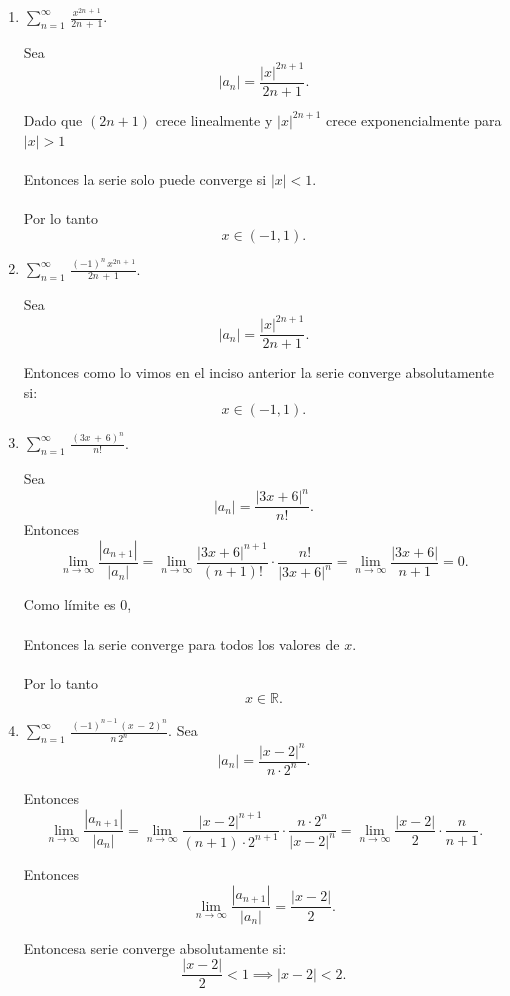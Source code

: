 \documentclass{article}
\begin{document}
\begin{enumerate}
\begin{enumerate}
\item $\displaystyle\sum_{n=1}^{\infty}\,\frac{x^{2n\,+\,1}}{2n\,+\,1}$.

Sea
   \[
   \left|a_n\right| = \frac{|x|^{2n+1}}{2n+1}.
   \]

Dado que \( (2n+1) \) crece linealmente y \(|x|^{2n+1}\) crece exponencialmente para \(|x| > 1\)\\
\\
Entonces la serie solo puede converge si \(|x| < 1\).\\
\\
Por lo tanto
   \[
   x \in (-1, 1).
   \]

\item $\displaystyle\sum_{n=1}^{\infty}\,\frac{(-1)^n\,x^{2n\,+\,1}}{2n\,+\,1}$.

Sea
   \[
   \left|a_n\right| = \frac{|x|^{2n+1}}{2n+1}.
   \]

Entonces como lo vimos en el inciso anterior la serie converge absolutamente si:
   \[
   x \in (-1, 1).
   \]

\item $\displaystyle\sum_{n=1}^{\infty}\,\frac{(3x\,+\,6)^n}{n!}$.

Sea
   \[
   \left|a_n\right| = \frac{|3x + 6|^n}{n!}.
   \]
Entonces
   \[
   \lim_{n \to \infty} \frac{|a_{n+1}|}{|a_n|} = \lim_{n \to \infty} \frac{|3x + 6|^{n+1}}{(n+1)!} \cdot \frac{n!}{|3x + 6|^n} = \lim_{n \to \infty} \frac{|3x + 6|}{n+1} = 0.
   \]

Como límite es \(0\), \\
\\
Entonces la serie converge  para todos los valores de \(x\).\\
\\
Por lo tanto\\
   \[
   x \in \mathbb{R}.
   \]


\item $\displaystyle\sum_{n=1}^{\infty}\,\frac{(-1)^{n-1}\,(x\,-\,2)^n}{n\,2^n}$.
Sea
   \[
   \left|a_n\right| = \frac{|x - 2|^n}{n \cdot 2^n}.
   \]

Entonces
   \[
   \lim_{n \to \infty} \frac{|a_{n+1}|}{|a_n|} = \lim_{n \to \infty} \frac{|x - 2|^{n+1}}{(n+1) \cdot 2^{n+1}} \cdot \frac{n \cdot 2^n}{|x - 2|^n} = \lim_{n \to \infty} \frac{|x - 2|}{2} \cdot \frac{n}{n+1}.
   \]

Entonces
   \[
   \lim_{n \to \infty} \frac{|a_{n+1}|}{|a_n|} = \frac{|x - 2|}{2}.
   \]

Entoncesa serie converge absolutamente si:
   \[
   \frac{|x - 2|}{2} < 1 \implies |x - 2| < 2.
   \]


\end{enumerate}
\end{enumerate}
\end{document}
